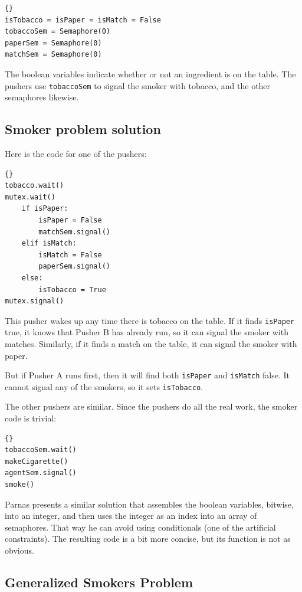 \documentclass{book}
\newcommand{\clearemptydoublepage}{\newpage\cleardoublepage}
\begin{document}
\begin{lstlisting}[caption={Smokers problem hint}]{}
isTobacco = isPaper = isMatch = False
tobaccoSem = Semaphore(0)
paperSem = Semaphore(0)
matchSem = Semaphore(0)
\end{lstlisting}

The boolean variables indicate whether or not an ingredient
is on the table.  The pushers use {\tt tobaccoSem} to signal
the smoker with tobacco, and the other semaphores likewise.


\clearemptydoublepage
\subsection{Smoker problem solution}

Here is the code for one of the pushers:

\begin{lstlisting}[caption={Pusher A}]{}
tobacco.wait()
mutex.wait()
    if isPaper:
        isPaper = False
        matchSem.signal()
    elif isMatch:
        isMatch = False
        paperSem.signal()
    else: 
        isTobacco = True
mutex.signal()
\end{lstlisting}

This pusher wakes up any time there is tobacco on the
table.  If it finds {\tt isPaper} true, it knows that
Pusher B has already run, so it can signal the smoker
with matches.  Similarly, if it finds a match on the
table, it can signal the smoker with paper.

But if Pusher A runs first, then it will find both
{\tt isPaper} and {\tt isMatch} false.  It cannot signal
any of the smokers, so it sets {\tt isTobacco}.

The other pushers are similar.  Since the pushers do all
the real work, the smoker code is trivial:

\begin{lstlisting}[caption={Smoker with tobacco}]{}
tobaccoSem.wait()
makeCigarette()
agentSem.signal()
smoke()
\end{lstlisting}

Parnas presents a similar solution that assembles the
boolean variables, bitwise, into an integer, and then
uses the integer as an index into an array of semaphores.
That way he can avoid using conditionals (one of the
artificial constraints).  The resulting code is a bit
more concise, but its function is not as obvious.


\subsection{Generalized Smokers Problem}
\end{document}
